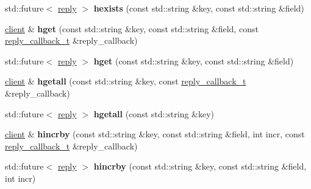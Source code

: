 \begin{DoxyCompactItemize}
std\+::future$<$ \mbox{\hyperlink{classcpp__redis_1_1reply}{reply}} $>$ {\bfseries hexists} (const std\+::string \&key, const std\+::string \&field)
\item 
\mbox{\label{classcpp__redis_1_1client_ac1db14da1ab3d1353ce35a1c923979e3}} 
\mbox{\hyperlink{classcpp__redis_1_1client}{client}} \& {\bfseries hget} (const std\+::string \&key, const std\+::string \&field, const \mbox{\hyperlink{classcpp__redis_1_1client_af7a65eb21aa25230bfbb0b0203c4fc04}{reply\+\_\+callback\+\_\+t}} \&reply\+\_\+callback)
\item 
\mbox{\label{classcpp__redis_1_1client_aa84b4c8e9391f5ed37d4c9ef977e2c85}} 
std\+::future$<$ \mbox{\hyperlink{classcpp__redis_1_1reply}{reply}} $>$ {\bfseries hget} (const std\+::string \&key, const std\+::string \&field)
\item 
\mbox{\label{classcpp__redis_1_1client_a8bd82cb86dad87a944c039a57bf67968}} 
\mbox{\hyperlink{classcpp__redis_1_1client}{client}} \& {\bfseries hgetall} (const std\+::string \&key, const \mbox{\hyperlink{classcpp__redis_1_1client_af7a65eb21aa25230bfbb0b0203c4fc04}{reply\+\_\+callback\+\_\+t}} \&reply\+\_\+callback)
\item 
\mbox{\label{classcpp__redis_1_1client_a44321960e02c6ee6b6b36ffc960e4257}} 
std\+::future$<$ \mbox{\hyperlink{classcpp__redis_1_1reply}{reply}} $>$ {\bfseries hgetall} (const std\+::string \&key)
\item 
\mbox{\label{classcpp__redis_1_1client_a517b6bdeb07edf20f5e57eb1b4942dd5}} 
\mbox{\hyperlink{classcpp__redis_1_1client}{client}} \& {\bfseries hincrby} (const std\+::string \&key, const std\+::string \&field, int incr, const \mbox{\hyperlink{classcpp__redis_1_1client_af7a65eb21aa25230bfbb0b0203c4fc04}{reply\+\_\+callback\+\_\+t}} \&reply\+\_\+callback)
\item 
\mbox{\label{classcpp__redis_1_1client_aee1f9d8b1fe77bc5bed18000a9cf8b6f}} 
std\+::future$<$ \mbox{\hyperlink{classcpp__redis_1_1reply}{reply}} $>$ {\bfseries hincrby} (const std\+::string \&key, const std\+::string \&field, int incr)
\item 
\mbox{\label{classcpp__redis_1_1client_ade2a386b51e8bbd59cd7feef51bd0637}} 

\end{DoxyCompactItemize}
